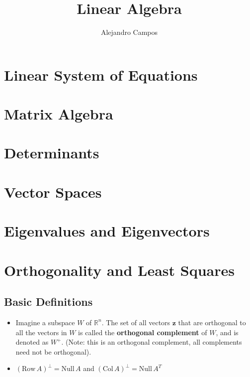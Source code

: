 \documentclass[11pt]{article}
\title{Linear Algebra}
\author{Alejandro Campos}
\begin{document}
\maketitle
\tableofcontents

\section{Linear System of Equations}

\section{Matrix Algebra}

\section{Determinants}

\section{Vector Spaces}

\section{Eigenvalues and Eigenvectors}

\section{Orthogonality and Least Squares}
\subsection{Basic Definitions}
\begin{itemize}
\item Imagine a subspace $W$ of $\mathbb{R}^n$. The set of all vectors $\mathbf{z}$ that are orthogonal to all the vectors in $W$ is called the \textbf{orthogonal complement} of $W$, and is denoted as $W^+$. (Note: this is an orthogonal complement, all complements need not be orthogonal).
\item $(\text{Row}\, A)^\perp = \text{Null}\,A$ and $(\text{Col}\,A)^\perp = \text{Null}\,A^T$
\end{itemize}
\end{document}
